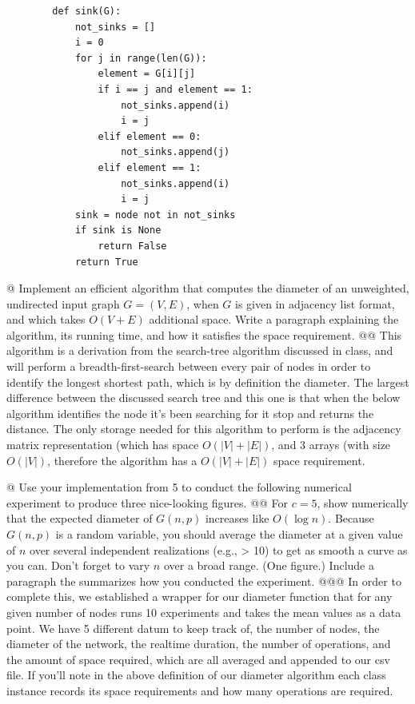 \documentclass[10pt]{article}
\begin{document}
\begin{easylist}[enumerate]
    \begin{lstlisting}
        def sink(G):
            not_sinks = []
            i = 0
            for j in range(len(G)):
                element = G[i][j]
                if i == j and element == 1:
                    not_sinks.append(i)
                    i = j
                elif element == 0:
                    not_sinks.append(j)
                elif element == 1:
                    not_sinks.append(i)
                    i = j
            sink = node not in not_sinks
            if sink is None
                return False
            return True
    \end{lstlisting}

    @ Implement an efficient algorithm that computes the diameter of an unweighted, undirected input graph $G = (V, E)$,
    when $G$ is given in adjacency list format, and which takes $O(V + E)$ additional space. Write a paragraph
    explaining the algorithm, its running time, and how it satisfies the space requirement.
    @@ This algorithm is a derivation from the search-tree algorithm discussed in class, and will perform a
    breadth-first-search between every pair of nodes in order to identify the longest shortest path, which is by
    definition the diameter. The largest difference between the discussed search tree and this one is that when the
    below algorithm identifies the node it's been searching for it stop and returns the distance. The only storage
    needed for this algorithm to perform is the adjacency matrix representation (which has space $O(|V| + |E|)$, and 3
    arrays (with size $O(|V|)$, therefore the algorithm has a $O(|V| + |E|)$ space requirement.

    @ Use your implementation from 5 to conduct the following numerical experiment to produce three nice-looking
    figures.
    @@ For $c = 5$, show numerically that the expected diameter of $G(n, p)$ increases like $O(\log n)$. Because $G(n,
    p)$ is a random variable, you should average the diameter at a given value of $n$ over several independent
    realizations (e.g., > 10) to get as smooth a curve as you can. Don't forget to vary $n$ over a broad range. (One
    figure.) Include a paragraph the summarizes how you conducted the experiment.
    @@@ In order to complete this, we established a wrapper for our diameter function that for any given number of nodes
    runs 10 experiments and takes the mean values as a data point. We have 5 different datum to keep track of, the
    number of nodes, the diameter of the network, the realtime duration, the number of operations, and the amount of
    space required, which are all averaged and appended to our csv file. If you'll note in the above definition of our
    diameter algorithm each class instance records its space requirements and how many operations are required.


\end{easylist}
\end{document}
